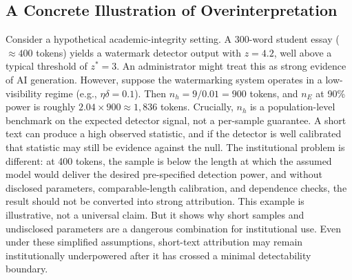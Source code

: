 \documentclass[11pt]{article}
\begin{document}
\subsection{A Concrete Illustration of Overinterpretation}
Consider a hypothetical academic-integrity setting. A 300-word student essay
($\approx 400$ tokens) yields a watermark detector output with $z = 4.2$, well
above a typical threshold of $z^* = 3$. An administrator might treat this as strong
evidence of AI generation. However, suppose the watermarking system operates in a
low-visibility regime (e.g., $\eta\delta = 0.1$). Then $n_h = 9/0.01 = 900$ tokens,
and $n_E$ at 90\% power is roughly $2.04 \times 900 \approx 1{,}836$ tokens.
Crucially, $n_h$ is a population-level benchmark on the expected detector signal,
not a per-sample guarantee. A short text can produce a high observed statistic, and
if the detector is well calibrated that statistic may still be evidence against the
null. The institutional problem is different: at 400 tokens, the sample is below the
length at which the assumed model would deliver the desired pre-specified detection
power, and without disclosed parameters, comparable-length calibration, and
dependence checks, the result should not be converted into strong attribution.
This example is illustrative, not a universal claim. But it shows why short samples
and undisclosed parameters are a dangerous combination for institutional use. Even
under these simplified assumptions, short-text attribution may remain
institutionally underpowered after it has crossed a minimal detectability boundary.
\end{document}
